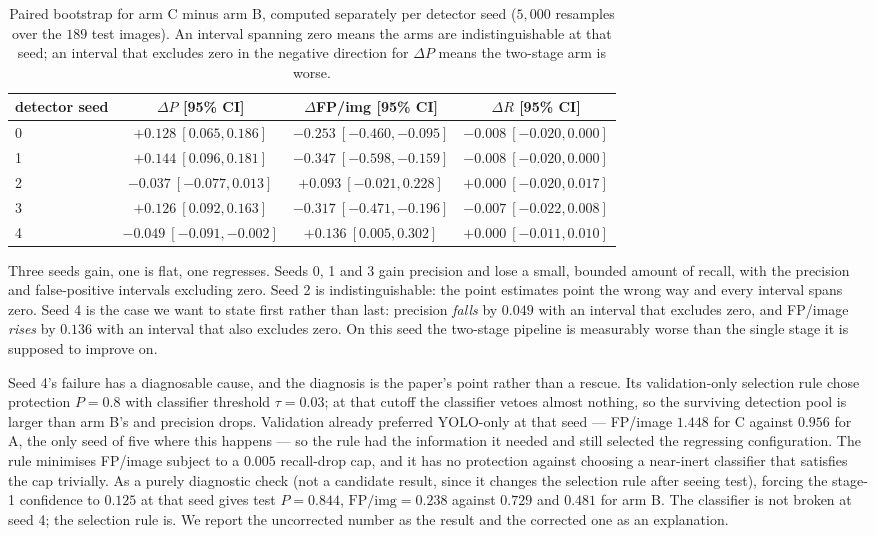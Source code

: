 \begin{table}[t]
\centering
\small
\caption{Paired bootstrap for arm C minus arm B, computed separately per detector
seed ($5{,}000$ resamples over the $189$ test images). An interval spanning zero
means the arms are indistinguishable at that seed; an interval that excludes zero
in the negative direction for $\Delta P$ means the two-stage arm is worse.}
\label{tab:cb}
\setlength{\tabcolsep}{5pt}
\begin{tabular}{lccc}
\toprule
detector seed & $\Delta P$ [95\% CI] & $\Delta$FP/img [95\% CI] & $\Delta R$ [95\% CI] \\
\midrule
0 & $+0.128\ [0.065, 0.186]$ & $-0.253\ [-0.460, -0.095]$ & $-0.008\ [-0.020, 0.000]$ \\
1 & $+0.144\ [0.096, 0.181]$ & $-0.347\ [-0.598, -0.159]$ & $-0.008\ [-0.020, 0.000]$ \\
2 & $-0.037\ [-0.077, 0.013]$ & $+0.093\ [-0.021, 0.228]$ & $+0.000\ [-0.020, 0.017]$ \\
3 & $+0.126\ [0.092, 0.163]$ & $-0.317\ [-0.471, -0.196]$ & $-0.007\ [-0.022, 0.008]$ \\
4 & $-0.049\ [-0.091, -0.002]$ & $+0.136\ [0.005, 0.302]$ & $+0.000\ [-0.011, 0.010]$ \\
\bottomrule
\end{tabular}
\end{table}

Three seeds gain, one is flat, one regresses. Seeds 0, 1 and 3 gain precision and
lose a small, bounded amount of recall, with the precision and false-positive
intervals excluding zero. Seed 2 is indistinguishable: the point estimates point
the wrong way and every interval spans zero. Seed 4 is the case we want to state
first rather than last: precision \emph{falls} by $0.049$ with an interval that
excludes zero, and FP/image \emph{rises} by $0.136$ with an interval that also
excludes zero. On this seed the two-stage pipeline is measurably worse than the
single stage it is supposed to improve on.

Seed 4's failure has a diagnosable cause, and the diagnosis is the paper's point
rather than a rescue. Its validation-only selection rule chose protection $P=0.8$
with classifier threshold $\tau = 0.03$; at that cutoff the classifier vetoes
almost nothing, so the surviving detection pool is larger than arm B's and
precision drops. Validation already preferred YOLO-only at that seed ---
FP/image $1.448$ for C against $0.956$ for A, the only seed of five where this
happens --- so the rule had the information it needed and still selected the
regressing configuration. The rule minimises FP/image subject to a
$0.005$ recall-drop cap, and it has no protection against choosing a
near-inert classifier that satisfies the cap trivially. As a purely diagnostic
check (not a candidate result, since it changes the selection rule after seeing
test), forcing the stage-1 confidence to $0.125$ at that seed gives test
$P = 0.844$, $\mathrm{FP/img} = 0.238$ against $0.729$ and $0.481$ for arm B. The
classifier is not broken at seed 4; the selection rule is. We report the uncorrected
number as the result and the corrected one as an explanation.

